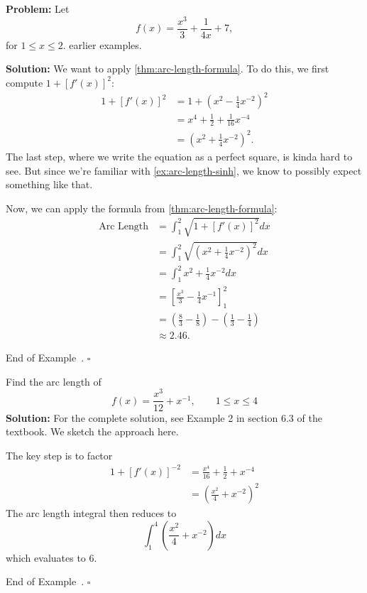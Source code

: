 \documentclass[10pt]{article}
\theoremstyle{definition}
\newtheorem{example}[theorem]{Example}
\renewenvironment{example}
{\begin{oldexample}}
  {\par\smallskip\hfill   End of Example~\theexample. $\square$    \par\end{oldexample}}
\newcommand{\vt}{\vskip 5mm} %
\newcommand{\fl}{\noindent\textbf} %
\newcommand{\Fl}{\vt\noindent\textbf} %
\newcommand{\1}[1]{\textbf{1}_{\left[#1\right]}} %
\begin{document}
\begin{example}[Arc length]
  \Fl{Problem:} Let
  \begin{equation*}
    f(x) = \frac{x^{3}}{3} + \frac{1}{4x}+7,
  \end{equation*}
  for $1 \leq x \leq 2$.
  earlier examples.

  \Fl{Solution:} We want to apply
  \cref{thm:arc-length-formula}. To do this, we first compute $1+\left[ f'(x) \right]^{2}$:
  \begin{align*}
    1+\left[ f'(x) \right]^{2}
    &= 1 + \left( x^{2} - \frac{1}{4}x^{-2} \right)^{2}\\
    &= x^{4}+\frac{1}{2} + \frac{1}{16}x^{-4}\\
    &= \left( x^{2}+\frac{1}{4}x^{-2} \right)^{2}. 
  \end{align*}
  The last step, where we write the equation as a perfect square, is kinda hard to see. But since we're
  familiar with \cref{ex:arc-length-sinh}, we know to possibly expect something like that.
  
  Now, we can apply the formula from \cref{thm:arc-length-formula}:
  \begin{align*}
    \text{Arc Length} 
    &= \int_{1}^{2} \sqrt{1+\left[ f'(x) \right]^{2} }dx\\
    &= \int_{1}^{2} \sqrt{ \left( x^{2}+\frac{1}{4}x^{-2} \right)^{2}  }dx\\
    &= \int_{1}^{2} x^{2}+\frac{1}{4}x^{-2} dx\\
    &= \left[ \frac{x^{3}}{3} - \frac{1}{4}x^{-1} \right]^{2}_{1}\\ 
    &= \left( \frac{8}{3}- \frac{1}{8} \right) - \left( \frac{1}{3}- \frac{1}{4} \right)\\  
    &\approx 2.46.
  \end{align*}
\end{example}


\begin{example}
  Find the arc length of 
  \begin{equation*}
    f(x) = \frac{x^{3}}{12}+x^{-1}, \qquad 1 \leq x \leq 4
  \end{equation*}
  \fl{Solution:} For the complete solution, see Example 2 in section 6.3 of
  the textbook. We sketch the approach here.
  
  The key step is to factor
  \begin{align*}
    1+[f'(x)]^{-2} 
    &= \frac{x^{4}}{16}+\frac{1}{2}+x^{-4}\\
    &= \left( \frac{x^{2}}{4}+x^{-2} \right)^{2}
  \end{align*}
  The arc length integral then reduces to
  \begin{equation*}
    \int_{1}^{4} \left( \frac{x^{2}}{4}+ x^{-2} \right)dx  
  \end{equation*}
  which evaluates to $6$. 
\end{example}
\end{document}
